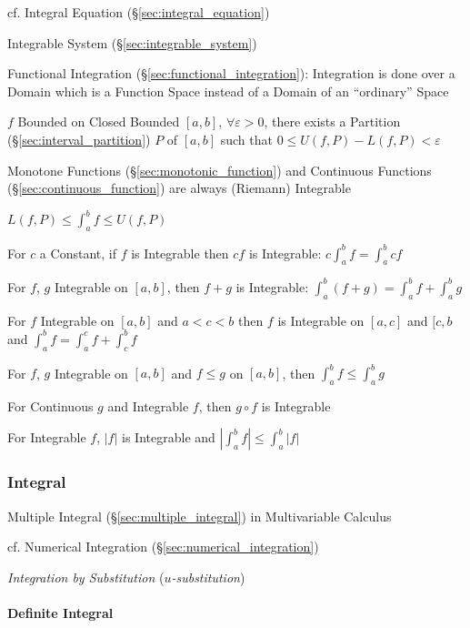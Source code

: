 cf. Integral Equation (\S\ref{sec:integral_equation})

\fist Integrable System (\S\ref{sec:integrable_system})

\fist Functional Integration (\S\ref{sec:functional_integration}): Integration
is done over a Domain which is a Function Space instead of a Domain of an
``ordinary'' Space

$f$ Bounded on Closed Bounded $[a,b]$, $\forall \varepsilon >0$, there
exists a Partition (\S\ref{sec:interval_partition}) $P$ of $[a,b]$
such that $0 \leq U(f,P) - L(f,P) < \varepsilon$ %

Monotone Functions (\S\ref{sec:monotonic_function}) and Continuous
Functions (\S\ref{sec:continuous_function}) are always (Riemann)
Integrable

$L(f,P) \leq \int_a^b f \leq U(f,P)$

For $c$ a Constant, if $f$ is Integrable then $cf$ is Integrable: $c
\int_a^b f = \int_a^b c f$

For $f$, $g$ Integrable on $[a,b]$, then $f + g$ is Integrable:
$\int_a^b (f+g) = \int_a^b f + \int_a^b g$

For $f$ Integrable on $[a,b]$ and $a < c < b$ then $f$ is Integrable
on $[a,c]$ and $[c,b$ and $\int_a^b f = \int_a^c f + \int_c^b f$

For $f$, $g$ Integrable on $[a,b]$ and $f \leq g$ on $[a,b]$, then
$\int_a^b f \leq \int_a^b g$

For Continuous $g$ and Integrable $f$, then $g \circ f$ is Integrable

For Integrable $f$, $|f|$ is Integrable and $|\int_a^b f| \leq
\int_a^b |f|$



\subsubsection{Integral}\label{sec:integral}

\fist Multiple Integral (\S\ref{sec:multiple_integral}) in Multivariable
Calculus

cf. Numerical Integration (\S\ref{sec:numerical_integration})

\emph{Integration by Substitution} (\emph{$u$-substitution})



\paragraph{Definite Integral}\label{sec:definite_integral}\hfill

